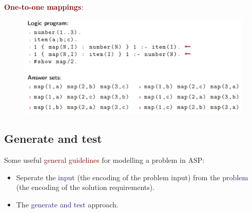 \vspace{0.35cm}

{\Large \textbf{\textcolor{Maroon}{One-to-one mappings}}}: 
\begin{figure}[ht!]
    \includegraphics[scale=0.6]{figures/one-to-one.png}
\end{figure}

\newpage
\subsection{Generate and test}
Some useful \textcolor{Maroon}{general guidelines} for modelling a problem in ASP:
\begin{itemize}
    \item Seperate the \textcolor{MidnightBlue}{input} (the encoding of the problem input) from the \textcolor{MidnightBlue}{problem} (the encoding of the solution requirements).
    \item The \textcolor{MidnightBlue}{generate and test} approach.
\end{itemize}

\vspace{0.5cm}

